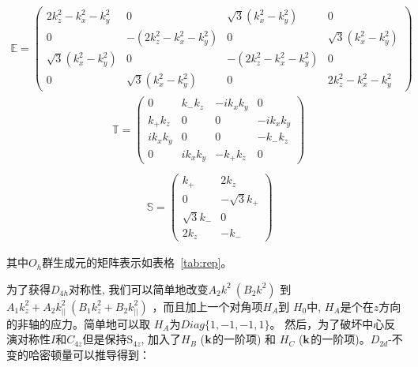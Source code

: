 \begin{equation}
    \begin{split}
        {\mathbb E} = \begin{pmatrix}
            2k_z^2-k_x^2-k_y^2 & 0 & \sqrt{3}(k_x^2-k_y^2) & 0 \\
            0 & -(2k_z^2-k_x^2-k_y^2) & 0 & \sqrt{3}(k_x^2-k_y^2) \\
            \sqrt{3}(k_x^2-k_y^2) & 0 & -(2k_z^2-k_x^2-k_y^2) & 0 \\
            0 & \sqrt{3}(k_x^2-k_y^2) & 0 & 2k_z^2-k_x^2-k_y^2
        \end{pmatrix}
            \end{split}
\end{equation}
\begin{equation}
    \begin{split}
& {\mathbb T} = \begin{pmatrix}
            0 & k_- k_z & -ik_x k_y & 0 \\
            k_+ k_z & 0 & 0 & -ik_x k_y \\
            ik_x k_y & 0 & 0 & -k_- k_z \\
            0 & i k_x k_y & -k_+ k_z & 0
        \end{pmatrix}~\\
    \end{split}
\end{equation}
\begin{equation}
    \begin{split}
&    {\mathbb S} = \begin{pmatrix}
        k_+ & 2k_z \\
        0 & -\sqrt{3}k_+ \\
        \sqrt{3}k_- & 0 \\
        2k_z & -k_-
    \end{pmatrix}
    \end{split}
\end{equation}


其中$O_h$群生成元的矩阵表示如表格~\ref{tab:rep}。


为了获得$D_{4h}$对称性, 我们可以简单地改变$A_2k^2~(B_2k^2)$ 到 $A_1k_z^2+A_2k_{||}^2~(B_1k_z^2+B_2k_{||}^2)$ ，而且加上一个对角项$H_A$到 $H_0$中, $H_A$是个在$z$方向的非轴的应力。简单地可以取 $H_A$为$Diag\{1,-1,-1,1\}$。
然后，为了破坏中心反演对称性$I$和$C_{4z}$但是保持S$_{4z}$, 加入了$H_B$ (${\bf k}$的一阶项) 和 $H_C$ (${\bf k}$的一阶项)。$D_{2d}$-不变的哈密顿量可以推导得到：


